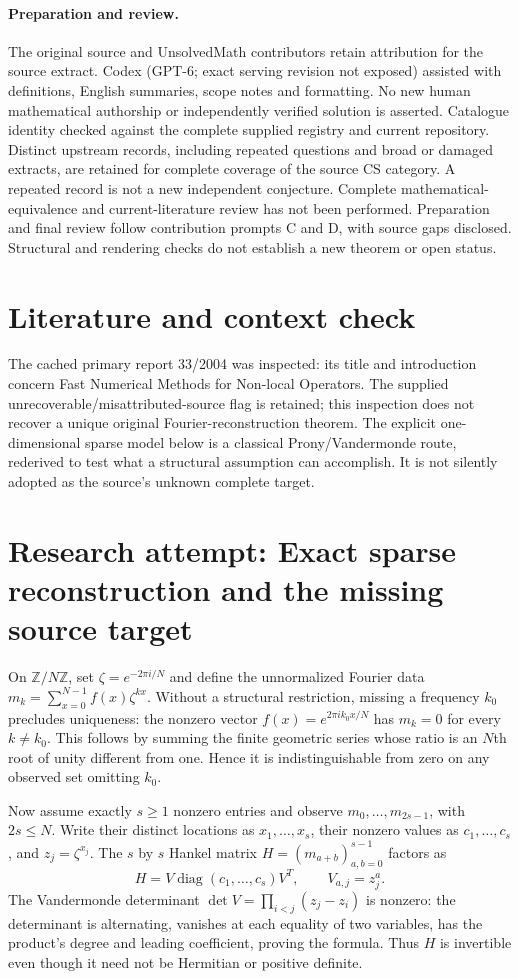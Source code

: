 \documentclass[11pt]{article}
\begin{document}
\paragraph{Preparation and review.}
The original source and UnsolvedMath contributors retain attribution for the source extract. Codex (GPT-6; exact serving revision not exposed) assisted with definitions, English summaries, scope notes and formatting. No new human mathematical authorship or independently verified solution is asserted. Catalogue identity checked against the complete supplied registry and current repository. Distinct upstream records, including repeated questions and broad or damaged extracts, are retained for complete coverage of the source CS category. A repeated record is not a new independent conjecture. Complete mathematical-equivalence and current-literature review has not been performed. Preparation and final review follow contribution prompts C and D, with source gaps disclosed. Structural and rendering checks do not establish a new theorem or open status.
\label{end:statement}

\section{Literature and context check}
The cached primary report 33/2004 was inspected: its title and introduction concern Fast Numerical Methods for Non-local Operators. The supplied unrecoverable/misattributed-source flag is retained; this inspection does not recover a unique original Fourier-reconstruction theorem. The explicit one-dimensional sparse model below is a classical Prony/Vandermonde route, rederived to test what a structural assumption can accomplish. It is not silently adopted as the source's unknown complete target.
\section{Research attempt: Exact sparse reconstruction and the missing source target}
On $\mathbb Z/N\mathbb Z$, set $\zeta=e^{-2\pi i/N}$ and define the unnormalized Fourier data $m_k=\sum_{x=0}^{N-1}f(x)\zeta^{kx}$. Without a structural restriction, missing a frequency $k_0$ precludes uniqueness: the nonzero vector $f(x)=e^{2\pi i k_0x/N}$ has $m_k=0$ for every $k\ne k_0$. This follows by summing the finite geometric series whose ratio is an $N$th root of unity different from one. Hence it is indistinguishable from zero on any observed set omitting $k_0$.

Now assume exactly $s\geq1$ nonzero entries and observe $m_0,\ldots,m_{2s-1}$, with $2s\leq N$. Write their distinct locations as $x_1,\ldots,x_s$, their nonzero values as $c_1,\ldots,c_s$, and $z_j=\zeta^{x_j}$. The $s$ by $s$ Hankel matrix $H=(m_{a+b})_{a,b=0}^{s-1}$ factors as
\[
 H=V\operatorname{diag}(c_1,\ldots,c_s)V^T,
 \qquad V_{a,j}=z_j^a.
\]
The Vandermonde determinant $\det V=\prod_{i<j}(z_j-z_i)$ is nonzero: the determinant is alternating, vanishes at each equality of two variables, has the product's degree and leading coefficient, proving the formula. Thus $H$ is invertible even though it need not be Hermitian or positive definite.
\end{document}
